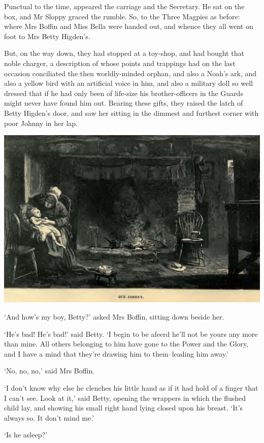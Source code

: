 Punctual to the time, appeared the carriage and the Secretary. He sat
on the box, and Mr Sloppy graced the rumble. So, to the Three Magpies as
before: where Mrs Boffin and Miss Bella were handed out, and whence they
all went on foot to Mrs Betty Higden’s.

But, on the way down, they had stopped at a toy-shop, and had bought
that noble charger, a description of whose points and trappings had on
the last occasion conciliated the then worldly-minded orphan, and also a
Noah’s ark, and also a yellow bird with an artificial voice in him,
and also a military doll so well dressed that if he had only been of
life-size his brother-officers in the Guards might never have found him
out. Bearing these gifts, they raised the latch of Betty Higden’s door,
and saw her sitting in the dimmest and furthest corner with poor Johnny
in her lap.

\includegraphics[scale=2.3]{02-09-01}

‘And how’s my boy, Betty?’ asked Mrs Boffin, sitting down beside her.

‘He’s bad! He’s bad!’ said Betty. ‘I begin to be afeerd he’ll not be
yours any more than mine. All others belonging to him have gone to
the Power and the Glory, and I have a mind that they’re drawing him to
them--leading him away.’

‘No, no, no,’ said Mrs Boffin.

‘I don’t know why else he clenches his little hand as if it had hold of
a finger that I can’t see. Look at it,’ said Betty, opening the wrappers
in which the flushed child lay, and showing his small right hand lying
closed upon his breast. ‘It’s always so. It don’t mind me.’

‘Is he asleep?’

